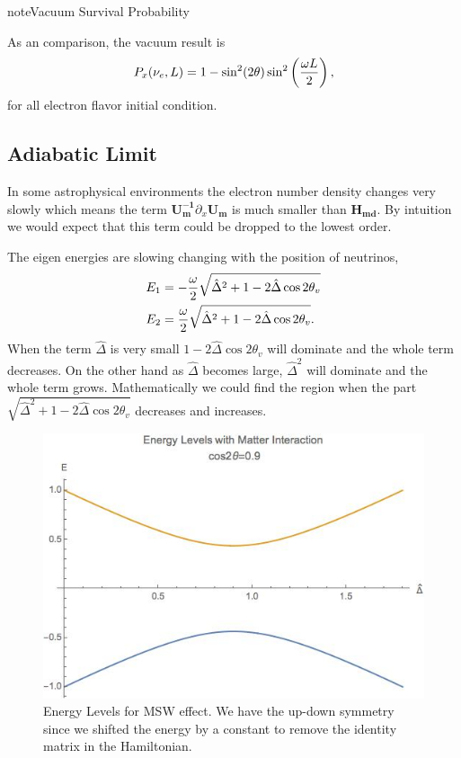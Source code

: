 \documentclass[letterpaper,12pt,english]{sphinxmanual}
\begin{document}
\begin{notice}{note}{Vacuum Survival Probability}

As an comparison, the vacuum result is
\begin{gather}
\begin{split}P_x(\nu_e,L) = 1 - \sin^2(2\theta)\sin^2\left( \frac{\omega L}{2} \right) ,\end{split}\notag
\end{gather}
for all electron flavor initial condition.
\end{notice}


\subsection{Adiabatic Limit}
\label{msw:adiabatic-limit}
In some astrophysical environments the electron number density changes very slowly which means the term \(\mathbf{U_m^{-1}} \partial_x \mathbf{U_m}\) is much smaller than \(\mathbf{H_{md}}\). By intuition we would expect that this term could be dropped to the lowest order.

The eigen energies are slowing changing with the position of neutrinos,
\begin{gather}
\begin{split}E_1 & = -\frac{\omega}{2}\sqrt{\hat\Delta^2 + 1 - 2 \hat\Delta  \cos 2\theta_v} \\
E_2 & = \frac{\omega}{2}\sqrt{\hat\Delta^2 + 1 - 2 \hat\Delta  \cos 2\theta_v}.\end{split}\notag
\end{gather}
When the term \(\hat\Delta\) is very small \(1-2\hat\Delta\cos 2\theta_v\) will dominate and the whole term decreases. On the other hand as \(\hat\Delta\) becomes large, \(\hat\Delta^2\) will dominate and the whole term grows. Mathematically we could find the region when the part \(\sqrt{\hat\Delta^2 + 1 - 2 \hat\Delta  \cos 2\theta_v}\) decreases and increases.
\begin{figure}[htbp]
\centering
\capstart

\includegraphics{mswEnergyLevels.jpg}
\caption{Energy Levels for MSW effect. We have the up-down symmetry since we shifted the energy by a constant to remove the identity matrix in the Hamiltonian.}\end{figure}
\end{document}
